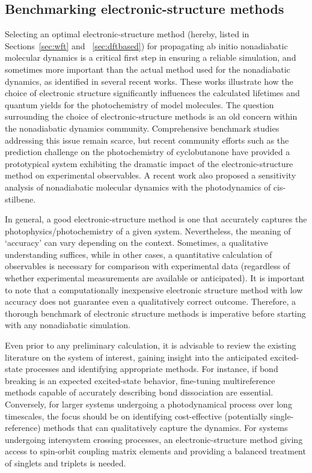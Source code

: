 \documentclass[9pt,bestpractices,pubversion]{livecoms}
\begin{document}
\subsection{Benchmarking electronic-structure methods}
\label{sec:banchmarkelstr}
Selecting an optimal electronic-structure method (hereby, listed in Sections~\ref{sec:wft} and ~\ref{sec:dftbased}) for propagating ab initio nonadiabatic molecular dynamics is a critical first step in ensuring a reliable simulation, and sometimes more important than the actual method used for the nonadiabatic dynamics, as identified in several recent works.\cite{janos2023controls,papineau2024,crespo2018recent} These works illustrate how the choice of electronic structure significantly influences the calculated lifetimes and quantum yields for the photochemistry of model molecules. The question surrounding the choice of electronic-structure methods is an old concern within the nonadiabatic dynamics community. Comprehensive benchmark studies addressing this issue remain scarce, but recent community efforts such as the prediction challenge on the photochemistry of cyclobutanone have provided a prototypical system exhibiting the dramatic impact of the electronic-structure method on experimental observables.\cite{predictionchallenge} A recent work also proposed a sensitivity analysis of nonadiabatic molecular dynamics with the photodynamics of cis-stilbene.\cite{tomas2024}

In general, a good electronic-structure method is one that accurately captures the photophysics/photochemistry of a given system. Nevertheless, the meaning of `accuracy' can vary depending on the context. Sometimes, a qualitative understanding suffices, while in other cases, a quantitative calculation of observables is necessary for comparison with experimental data (regardless of whether experimental measurements are available or anticipated). It is important to note that a computationally inexpensive electronic structure method with low accuracy does not guarantee even a qualitatively correct outcome. Therefore, a thorough benchmark of electronic structure methods is imperative before starting with any nonadiabatic simulation.

Even prior to any preliminary calculation, it is advisable to review the existing literature on the system of interest, gaining insight into the anticipated excited-state processes and identifying appropriate methods. For instance, if bond breaking is an expected excited-state behavior, fine-tuning multireference methods capable of accurately describing bond dissociation are essential. Conversely, for larger systems undergoing a photodynamical process over long timescales, the focus should be on identifying cost-effective (potentially single-reference) methods that can qualitatively capture the dynamics. For systems undergoing intersystem crossing processes, an electronic-structure method giving access to spin-orbit coupling matrix elements and providing a balanced treatment of singlets and triplets is needed.
\end{document}
